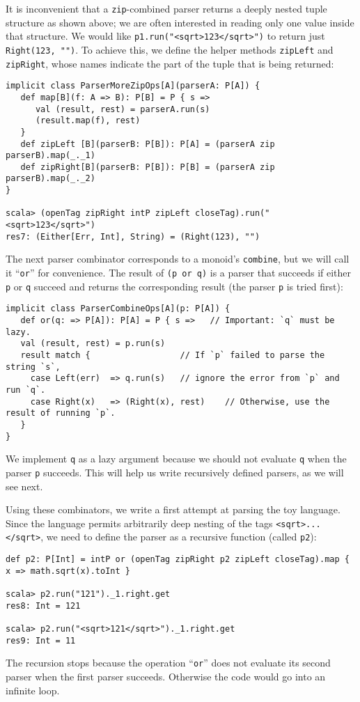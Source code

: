It is inconvenient that a \lstinline!zip!-combined parser returns
a deeply nested tuple structure as shown above; we are often interested
in reading only one value inside that structure. We would like \lstinline!p1.run("<sqrt>123</sqrt>")!
to return just \lstinline!Right(123, "")!. To achieve this, we define
the helper methods \lstinline!zipLeft! and \lstinline!zipRight!,
whose names indicate the part of the tuple that is being returned:
\begin{lstlisting}
implicit class ParserMoreZipOps[A](parserA: P[A]) {
   def map[B](f: A => B): P[B] = P { s =>
      val (result, rest) = parserA.run(s)
      (result.map(f), rest)
   }
   def zipLeft [B](parserB: P[B]): P[A] = (parserA zip parserB).map(_._1)
   def zipRight[B](parserB: P[B]): P[B] = (parserA zip parserB).map(_._2)
}

scala> (openTag zipRight intP zipLeft closeTag).run("<sqrt>123</sqrt>")
res7: (Either[Err, Int], String) = (Right(123), "")
\end{lstlisting}

The next parser combinator corresponds to a monoid\textsf{'}s \lstinline!combine!,
but we will call it \textsf{``}\lstinline!or!\textsf{''} for convenience. The result
of \lstinline!(p or q)! is a parser that succeeds if either \lstinline!p!
or \lstinline!q! succeed and returns the corresponding result (the
parser \lstinline!p! is tried first):
\begin{lstlisting}
implicit class ParserCombineOps[A](p: P[A]) {
   def or(q: => P[A]): P[A] = P { s =>   // Important: `q` must be lazy.
   val (result, rest) = p.run(s)
   result match {                  // If `p` failed to parse the string `s`,
     case Left(err)  => q.run(s)   // ignore the error from `p` and run `q`.
     case Right(x)   => (Right(x), rest)    // Otherwise, use the result of running `p`.
   }
}    
\end{lstlisting}
We implement \lstinline!q! as a lazy argument because we should not
evaluate \lstinline!q! when the parser \lstinline!p! succeeds. This
will help us write recursively defined parsers, as we will see next.

Using these combinators, we write a first attempt at parsing the toy
language. Since the language permits arbitrarily deep nesting of the
tags \lstinline!<sqrt>...</sqrt>!, we need to define the parser as
a recursive function (called \lstinline!p2!):
\begin{lstlisting}
def p2: P[Int] = intP or (openTag zipRight p2 zipLeft closeTag).map { x => math.sqrt(x).toInt }

scala> p2.run("121")._1.right.get
res8: Int = 121

scala> p2.run("<sqrt>121</sqrt>")._1.right.get
res9: Int = 11
\end{lstlisting}
The recursion stops because the operation \textsf{``}\lstinline!or!\textsf{''} does
not evaluate its second parser when the first parser succeeds. Otherwise
the code would go into an infinite loop.

